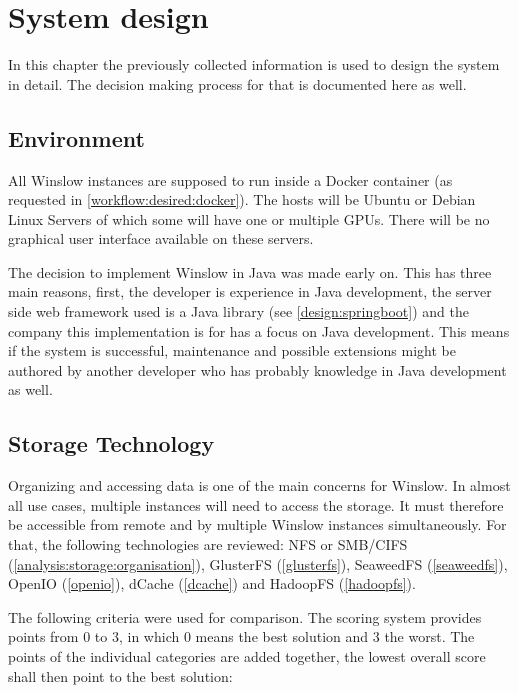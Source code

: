 \chapter{System design}

In this chapter the previously collected information is used to design the system in detail.
The decision making process for that is documented here as well.


\section{Environment}

All Winslow instances are supposed to run inside a Docker container (as requested in \autoref{workflow:desired:docker}).
The hosts will be Ubuntu or Debian Linux Servers of which some will have one or multiple GPUs.
There will be no graphical user interface available on these servers.

The decision to implement Winslow in Java was made early on.
This has three main reasons, first, the developer is experience in Java development, the server side web framework used is a Java library (see \autoref{design:springboot}) and the company this implementation is for has a focus on Java development.
This means if the system is successful, maintenance and possible extensions might be authored by another developer who has probably knowledge in Java development as well.


\section{Storage Technology}

Organizing and accessing data is one of the main concerns for Winslow.
In almost all use cases, multiple instances will need to access the storage.
It must therefore be accessible from remote and by multiple Winslow instances simultaneously.
For that, the following technologies are reviewed: NFS or SMB/CIFS (\autoref{analysis:storage:organisation}),  GlusterFS (\autoref{glusterfs}), SeaweedFS (\autoref{seaweedfs}), OpenIO (\autoref{openio}), dCache (\autoref{dcache}) and HadoopFS (\autoref{hadoopfs}).

The following criteria were used for comparison.
The scoring system provides points from 0 to 3, in which 0 means the best solution and 3 the worst.
The points of the individual categories are added together, the lowest overall score shall then point to the best solution:

